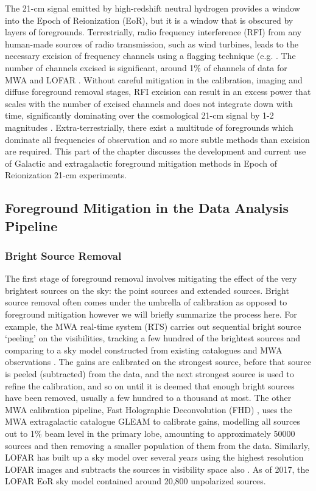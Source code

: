 The 21-cm signal emitted by high-redshift neutral hydrogen provides a window into the Epoch of Reionization (EoR), but it is a window that is obscured by layers of foregrounds. Terrestrially, radio frequency interference (RFI) from any human-made sources of radio transmission, such as wind turbines, leads to the necessary excision of frequency channels using a flagging technique (e.g. \cite{Offringa2012, Prasad2012ExA....33..157P}. The number of channels excised is significant, around 1$\%$ of channels of data for MWA and LOFAR \cite{Offringa2019MNRAS.484.2866O,Offringa2015PASA...32....8O}. Without careful mitigation in the calibration, imaging and diffuse foreground removal stages, RFI excision can result in an excess power that scales with the number of excised channels and does not integrate down with time, significantly dominating over the cosmological 21-cm signal by 1-2 magnitudes \cite{Offringa2019MNRAS.484.2866O}. Extra-terrestrially, there exist a multitude of foregrounds which dominate all frequencies of observation and so more subtle methods than excision are required. This part of the chapter discusses the development and current use of Galactic and extragalactic foreground mitigation methods in Epoch of Reionization 21-cm experiments.


\subsection{Foreground Mitigation in the Data Analysis Pipeline}
\subsubsection{Bright Source Removal}
The first stage of foreground removal involves mitigating the effect of the very brightest sources on the sky: the point sources and extended sources. Bright source removal often comes under the umbrella of calibration as opposed to foreground mitigation however we will briefly summarize the process here. For example, the MWA real-time system (RTS) \cite{Mitchell2008ISTSP...2..707M} carries out sequential bright source `peeling' on the visibilities, tracking a few hundred of the brightest sources and comparing to a sky model constructed from existing catalogues and MWA observations \cite{Carroll2016MNRAS.461.4151C}. The gains are calibrated on the strongest source, before that source is peeled (subtracted) from the data, and the next strongest source is used to refine the calibration, and so on until it is deemed that enough bright sources have been removed, usually a few hundred to a thousand at most. The other MWA calibration pipeline, Fast Holographic Deconvolution (FHD) \cite{Sullivan2012ApJ...759...17S}, uses the MWA extragalactic catalogue GLEAM \cite{hurleywalker17} to calibrate gains, modelling all sources out to 1$\%$ beam level in the primary lobe, amounting to approximately 50000 sources \cite{Barry2019arXiv190102980B} and then removing a smaller population of them from the data. Similarly, LOFAR has built up a sky model over several years using the highest resolution LOFAR images and subtracts the sources in visibility space also \cite{Yata2015MNRAS.449.4506Y,Yata2013AA...550A.136Y}. As of 2017, the LOFAR EoR sky model contained around 20,800 unpolarized sources. 

